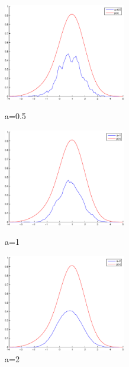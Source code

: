 \documentclass{article}
\theoremstyle{definition}
\theoremstyle{definition}
\theoremstyle{remark}
\begin{document}
\begin{figure}[!htbp]
\begin{minipage}[t]{0.3\linewidth}
\centering
\includegraphics[width=2.1in]{0_5.eps}
\caption{a=0.5}
\end{minipage}%
\begin{minipage}[t]{0.3\linewidth}
\centering
\includegraphics[width=2.1in]{1.eps}
\caption{a=1}
\end{minipage}
\begin{minipage}[t]{0.3\linewidth}
\centering
\includegraphics[width=2.1in]{2.eps}
\caption{a=2}
\end{minipage}
\end{figure}
\end{document}
